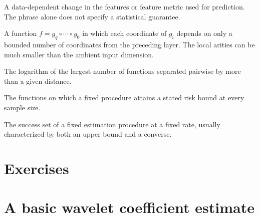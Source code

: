\documentclass[11pt,twoside]{article}
\theoremstyle{definition}
\theoremstyle{remark}
\renewcommand{\thesection}{15.\arabic{section}}
\begin{document}
\begin{description}[style=unboxed,leftmargin=1.5em,labelindent=0pt]
\item[Feature learning]
A data-dependent change in the features or feature metric used for
prediction. The phrase alone does not specify a statistical guarantee.
\item[Hierarchical composition model]
A function $f=g_q\circ\cdots\circ g_0$ in which each coordinate of $g_i$
depends on only a bounded number of coordinates from the preceding layer.
The local arities can be much smaller than the ambient input dimension.
\item[Packing entropy]
The logarithm of the largest number of functions separated pairwise by more
than a given distance.
\item[Success set]
The functions on which a fixed procedure attains a stated risk bound at
every sample size.
\item[Maxiset]
The success set of a fixed estimation procedure at a fixed rate, usually
characterized by both an upper bound and a converse.
\end{description}

\section{Exercises}
\label{sec:exercises}

\exerciseinstructions
\setcounter{courseexercise}{0}














\appendix
\renewcommand{\thesection}{15.\Alph{section}}

\section{A basic wavelet coefficient estimate}
\label{app:wavelet-facts}
\end{document}
